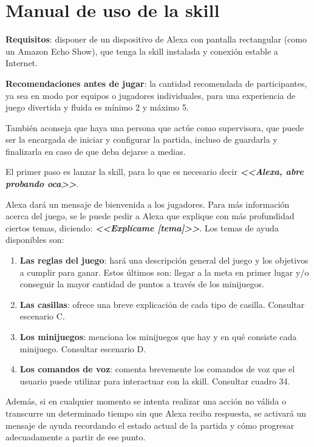 \section{Manual de uso de la skill}


\textbf{Requisitos}: disponer de un dispositivo de Alexa con pantalla rectangular (como un Amazon Echo Show), que tenga la skill instalada y conexión estable a Internet.

\vspace{0.5cm}

\textbf{Recomendaciones antes de jugar}: la cantidad recomendada de participantes, ya sea en modo por equipos o jugadores individuales, para una experiencia de juego divertida y fluida es mínimo 2 y máximo 5. 

También aconseja que haya una persona que actúe como supervisora, que puede ser la encargada de iniciar y configurar la partida, incluso de guardarla y finalizarla en caso de que deba dejarse a medias.

\vspace{0.5cm}

El primer paso es lanzar la skill, para lo que es necesario decir \textbf{\textit{<<Alexa, abre probando oca>>}}.

Alexa dará un mensaje de bienvenida a los jugadores. Para más información acerca del juego, se le puede pedir a Alexa que explique con más profundidad ciertos temas, diciendo: \textbf{\textit{<<Explícame [tema]>>}}. Los temas de ayuda disponibles son: 
\begin{enumerate}
	\item \textbf{Las reglas del juego}: hará una descripción general del juego y los objetivos a cumplir para ganar. Estos últimos son: llegar a la meta en primer lugar y/o conseguir la mayor cantidad de puntos a través de los minijuegos.
	\item \textbf{Las casillas}: ofrece una breve explicación de cada tipo de casilla. Consultar escenario C.
	\item \textbf{Los minijuegos}: menciona los minijuegos que hay y en qué consiste cada minijuego. Consultar escenario D.
	\item \textbf{Los comandos de voz}: comenta brevemente los comandos de voz que el usuario puede utilizar para interactuar con la skill. Consultar cuadro 34.
\end{enumerate}

Además, si en cualquier momento se intenta realizar una acción no válida o transcurre un determinado tiempo sin que Alexa reciba respuesta, se activará un mensaje de ayuda recordando el estado actual de la partida y cómo progresar adecuadamente a partir de ese punto.


